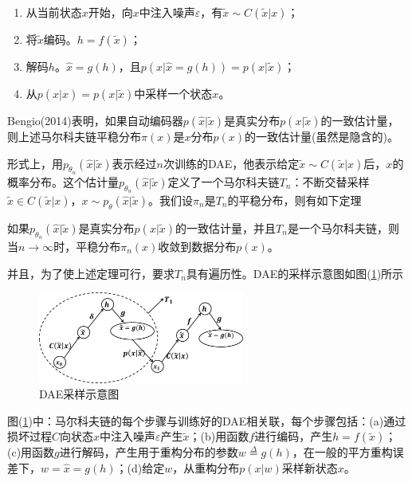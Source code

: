         \begin{enumerate}
        \item 从当前状态$x$开始，向$x$中注入噪声$\varepsilon$，有$\tilde{x}\sim C(\tilde{x}|x)$；
        \item 将$\tilde{x}$编码。$h = f(\tilde{x})$；
        \item 解码$h$。$\hat{x} = g(h)$，且$p(x|\hat{x} =g(h)) = p(x|\tilde{x})$；
        \item 从$p(x|\hat{x}) = p(x|\tilde{x})$中采样一个状态$x$。
        \end{enumerate}
        \par
        Bengio(2014)表明，如果自动编码器$p(\hat{x}|\tilde{x})$是真实分布$p(x|\tilde{x})$的一致估计量，则上述马尔科夫链平稳分布$\pi(x)$是$x$分布$p(x)$的一致估计量(虽然是隐含的)。
        \par
        形式上，用$p_{\theta_n}(\hat{x}|\tilde{x})$表示经过$n$次训练的DAE，他表示给定$\tilde{x}\sim C(\tilde{x}|x)$后，$x$的概率分布。这个估计量$p_{\theta_n}(\hat{x}|\tilde{x})$定义了一个马尔科夫链$T_n$：不断交替采样$\tilde{x}\in C(\tilde{x}|x)$，$x \sim p_\theta(\hat{x}|\tilde{x})$。我们设$\pi_n$是$T_n$的平稳分布，则有如下定理
        \begin{theorem}
        如果$p_{\theta_n}(\hat{x}|\tilde{x})$是真实分布$p(x|\tilde{x})$的一致估计量，并且$T_n$是一个马尔科夫链，则当$n\rightarrow \infty$时，平稳分布$\pi_n(x)$收敛到数据分布$p(x)$。
        \end{theorem}
        并且，为了使上述定理可行，要求$T_n$具有遍历性。DAE的采样示意图如图(\ref{fig:DAE采样示意图})所示
            \begin{figure}[H]
            \centering
            \includegraphics[height=3cm]{images/DAE_sampling.jpg}
            \caption{DAE采样示意图}
            \label{fig:DAE采样示意图}
            \end{figure}
        图(\ref{fig:DAE采样示意图})中：马尔科夫链的每个步骤与训练好的DAE相关联，每个步骤包括：(a)通过损坏过程$C$向状态$x$中注入噪声$\varepsilon$产生$\tilde{x}$；(b)用函数$f$进行编码，产生$h = f(\tilde{x})$；(c)用函数$g$进行解码，产生用于重构分布的参数$w\overset{\Delta}{=}g(h)$，在一般的平方重构误差下，$w = \hat{x} = g(h)$；(d)给定$w$，从重构分布$p(x|w)$采样新状态$x$。
